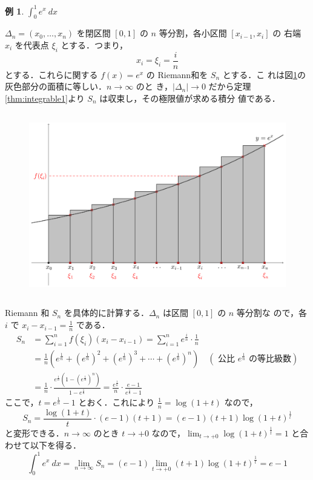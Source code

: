 \documentclass[10pt, uplatex, dvipdfmx]{jsarticle}
\theoremstyle{definition}
\newtheorem{example}[theorem]{例}
\numberwithin{equation}{section}
\newcommand{\ds}{\displaystyle}
\begin{document}
\newpage

\begin{example}
  $\ds \int_{0}^{1} e^x \ dx$ 

  \vspace{1zh}
  
  $\Delta_n=(x_0,\ldots, x_n)$ を閉区間 $[0,1]$ の $n$ 等分割，各小区間 $[x_{i-1},x_i]$ の
  右端 $x_i$ を代表点 $\xi_i$ とする．つまり，
  \[
    x_i = \xi_i = \frac{i}{n}
  \]
  とする．これらに関する $f(x) = e^x$ の Riemann和を $S_n$ とする．こ
  れは図\ref{fig:Rsum_exp}の灰色部分の面積に等しい．$n \to \infty$ のと
  き，$|\Delta_n| \to 0$ だから定理\ref{thm:integrable1}より $S_n$ は収束し，その極限値が求める積分
  値である．
  \begin{figure}[h]
    \centering
    \includegraphics[height=8cm]{./pictures/02/exp.pdf}
    \caption{}\label{fig:Rsum_exp}
  \end{figure}
\end{example}

Riemann 和 $S_n$ を具体的に計算する．$\Delta_n$ は区間 $[0,1]$ の $n$ 等分割な
ので，各 $i$ で $\ds x_i-x_{i-1} = \frac{1}{n}$ である．
\[
  \begin{aligned}
    S_n &= \sum_{i=1}^{n} f(\xi_i) (x_i-x_{i-1}) = \sum_{i=1}^{n} e^{\frac{i}{n}} \cdot \frac{1}{n}\\[2ex]
        & = \frac{1}{n} \left( e^{\frac{1}{n}}
          + \left(e^{\frac{1}{n}}\right)^2 + \left( e^{\frac{1}{n}}\right)^3 +\cdots
          + \left( e^{\frac{1}{n}}\right)^n\right) \quad \left( \text{ 公比 $e^{\frac{1}{n}}$ の等比級数}\right)\\[2ex]
        & = \frac{1}{n} \cdot \frac{e^{\frac{1}{n}} \left( 1 - \left( e^{\frac{1}{n}}\right)^n\right)}{1-e^{\frac{1}{n}}}
          = \frac{e^{\frac{1}{n}}}{n} \cdot \frac{e-1}{e^{\frac{1}{n}}-1}
  \end{aligned}
\]
ここで，$\ds t=e^{\frac{1}{n}}-1$ とおく．これにより $\ds \frac{1}{n} = \log(1+t)$ なので，
\[
  S_n = \frac{\log(1+t)}{t} \cdot (e-1)(t+1) = (e-1) (t+1) \log(1+t)^{\frac{1}{t}}
\]
と変形できる．$n \to \infty$ のとき $t \to +0$ なので，$\ds \lim_{t \to +0} \log (1+t)^{\frac{1}{t}}=1$ と合わせて以下を得る．
\[
  \int_{0}^{1} e^x \ dx = \lim_{n \to \infty} S_n = (e-1) \lim_{t\to +0} (t+1) \log (1+t)^{\frac{1}{t}} = e-1
\]
\end{document}
